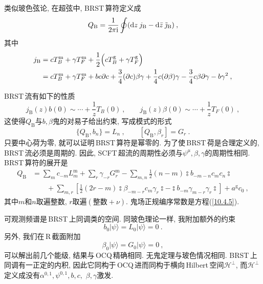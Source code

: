 类似玻色弦论, 在超弦中, BRST\,算符定义成
\begin{equation}
    Q_{\text{B}} = \frac{1}{2\pi\mathrm{i}}\oint (\mathrm{d} z\: j_{\text{B}}-\mathrm{d}\bar{z}\: \tilde{\jmath}_{\text{B}})\:,\label{10.5.20}
\end{equation}
其中
\begin{align}
    j_{\text{B}} &= c T_{B}^{\text{m}} +\gamma T_{F}^{\text{m}} +\frac{1}{2} \Bigl( cT_{B}^{\text{g}}+\gamma T_{F}^{\text{g}}\Bigr) \nonumber \\
    &=  c T_{B}^{\text{m}} +\gamma T_{F}^{\text{m}} + b c\partial c + \frac{3}{4}(\partial c)\beta\gamma
    +\frac{1}{4}c(\partial\beta)\gamma-\frac{3}{4}c\beta \partial\gamma -b\gamma^{2}\:, \label{10.5.21}
\end{align}

BRST\,流有如下的性质
\begin{equation}
    j_{\text{B}}(z)b(0)\sim \cdots + \frac{1}{z}T_{B}(0) \:, \qquad
    j_{\text{B}}(z)\beta(0) \sim \cdots +\frac{1}{z} T_{F}(0) \:, \label{10.5.22}
\end{equation}
这使得$ Q_{\text{B}} $与$ b,\beta $鬼的对易子给出约束, 写成模式的形式
\begin{equation}
    \{Q_{\text{B}},b_{n}\} = L_{n}\:, \qquad [Q_{\text{B}},\beta_{r}]=G_{r}\:. \label{10.5.23}
\end{equation}
只要中心荷为零, 就可以证明\,BRST\,算符是幂零的. 为了使\,BRST\,荷是合理定义的, BRST\,流必须是周期的. 因此, SCFT\,超流的周期性必须与$ \psi^{\mu},\beta,\gamma $的周期性相同. BRST\,算符的展开是
\begin{align}
    Q_{\text{B}} &= \sum_{m} c_{-m}L_{m}^{\text{m}} + \sum_{r}\gamma_{-r}G_{r}^{\text{m}} 
    -\sum_{m,n}\frac{1}{2}(n-m) \typecolon \!b_{-m-n} c_{m}c_{n}\typecolon  \nonumber \\
    &\qquad + \sum_{m,r}\left[\frac{1}{2}(2r-m)\typecolon \!\beta_{-m-r}c_{m}\gamma_{r}\!\typecolon
    - \typecolon\! b_{-m}\gamma_{m-r}\gamma_{r}\typecolon \right] + a^{\text{g}} c_{0} \:, \label{10.5.24}
\end{align}
其中$ m $和$ n $取遍整数, $r $取遍$(\text{整数}+\nu)$. 鬼场正规编序常数是方程(\ref{10.4.5}).

可观测频谱是\,BRST\,上同调类的空间. 同玻色理论一样, 我附加额外的约束
\begin{equation}
    b_{0}\lvert \psi\rangle = L_{0}\lvert\psi\rangle = 0 \:. \label{10.5.25} 
\end{equation}
另外, 我们在\,R\,截面附加
\begin{equation}
    \beta_{0}\lvert \psi \rangle = G_{0}\lvert \psi \rangle = 0\:, \label{10.5.26}
\end{equation}
可以解出前几个能级, 结果与\,OCQ\,精确相同. 无鬼定理与玻色情况相同. BRST\,上同调有一正定的内积, 因此它同构于\,OCQ\,进而同构于横向\,Hilbert\,空间$ \mathscr{H}^{\bot}$, 而$ \mathscr{H}^{\bot} $定义成没有$ \alpha^{0,1},\psi^{0,1},b,c,$ $\beta,\gamma $激发. 

